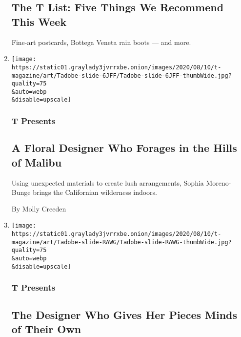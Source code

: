 \begin{enumerate}
{  \subsection{The T List: Five Things We Recommend This
  Week}\label{the-t-list-five-things-we-recommend-this-week-1}}

  Fine-art postcards, Bottega Veneta rain boots --- and more.
\item
  \href{/2020/08/10/t-magazine/sophia-moreno-bunge-floral-design.html}{}

  \texttt{[image: https://static01.graylady3jvrrxbe.onion/images/2020/08/10/t-magazine/art/Tadobe-slide-6JFF/Tadobe-slide-6JFF-thumbWide.jpg?quality=75\\\&auto=webp\\\&disable=upscale]}

  \hypertarget{t-presents}{%
  \subsubsection{T Presents}\label{t-presents}}

  \hypertarget{a-floral-designer-who-forages-in-the-hills-of-malibu}{%
  \subsection{A Floral Designer Who Forages in the Hills of
  Malibu}\label{a-floral-designer-who-forages-in-the-hills-of-malibu}}

  Using unexpected materials to create lush arrangements, Sophia
  Moreno-Bunge brings the Californian wilderness indoors.

  By Molly Creeden
\item
  \href{/2020/08/10/t-magazine/elizabeth-garouste-interior-design.html}{}

  \texttt{[image: https://static01.graylady3jvrrxbe.onion/images/2020/08/10/t-magazine/art/Tadobe-slide-RAWG/Tadobe-slide-RAWG-thumbWide.jpg?quality=75\\\&auto=webp\\\&disable=upscale]}

  \hypertarget{t-presents-1}{%
  \subsubsection{T Presents}\label{t-presents-1}}

  \hypertarget{the-designer-who-gives-her-pieces-minds-of-their-own}{%
  \subsection{The Designer Who Gives Her Pieces Minds of Their
  Own}\label{the-designer-who-gives-her-pieces-minds-of-their-own}}


\end{enumerate}
